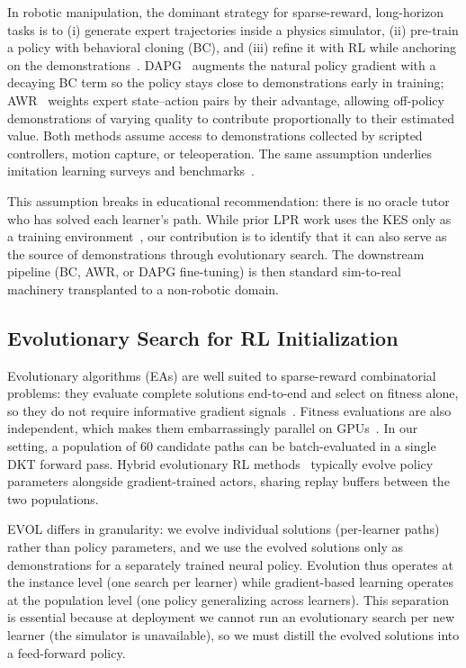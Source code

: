 \documentclass[sigconf,anonymous]{acmart}
\newcommand{\ours}{\textrm{EVOL}}
\begin{document}
In robotic manipulation, the dominant strategy for sparse-reward, long-horizon tasks is to (i) generate expert trajectories inside a physics simulator, (ii) pre-train a policy with behavioral cloning (BC), and (iii) refine it with RL while anchoring on the demonstrations~\cite{rajeswaran2018dexterous,nair2018demonstrations}. DAPG~\cite{rajeswaran2018dexterous} augments the natural policy gradient with a decaying BC term so the policy stays close to demonstrations early in training; AWR~\cite{peng2019awr} weights expert state--action pairs by their advantage, allowing off-policy demonstrations of varying quality to contribute proportionally to their estimated value. Both methods assume access to demonstrations collected by scripted controllers, motion capture, or teleoperation. The same assumption underlies imitation learning surveys and benchmarks~\cite{ross2011dagger,torabi2018bc}.

This assumption breaks in educational recommendation: there is no oracle tutor who has solved each learner's path. While prior LPR work uses the KES only as a training environment~\cite{liu2019cseal}, our contribution is to identify that it can also serve as the source of demonstrations through evolutionary search. The downstream pipeline (BC, AWR, or DAPG fine-tuning) is then standard sim-to-real machinery transplanted to a non-robotic domain.

\subsection{Evolutionary Search for RL Initialization}

Evolutionary algorithms (EAs) are well suited to sparse-reward combinatorial problems: they evaluate complete solutions end-to-end and select on fitness alone, so they do not require informative gradient signals~\cite{salimans2017es}. Fitness evaluations are also independent, which makes them embarrassingly parallel on GPUs~\cite{lange2023evosax}. In our setting, a population of 60 candidate paths can be batch-evaluated in a single DKT forward pass. Hybrid evolutionary RL methods~\cite{li2024evorl,khadka2018erl,jaderberg2017pbt} typically evolve policy parameters alongside gradient-trained actors, sharing replay buffers between the two populations.

\ours{} differs in granularity: we evolve individual solutions (per-learner paths) rather than policy parameters, and we use the evolved solutions only as demonstrations for a separately trained neural policy. Evolution thus operates at the instance level (one search per learner) while gradient-based learning operates at the population level (one policy generalizing across learners). This separation is essential because at deployment we cannot run an evolutionary search per new learner (the simulator is unavailable), so we must distill the evolved solutions into a feed-forward policy.
\end{document}

